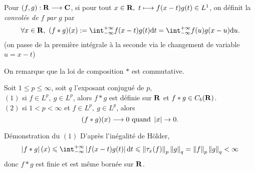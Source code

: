 \documentclass[a4paper,11pt, twoside]{article}
\begin{document}
\begin{Def}
  Pour $(f,g):\mathbf R\longrightarrow\mathbf C$, si pour tout $x\in \mathbf R,\ t\longmapsto f(x-t)g(t)\in L^1$, on définit la \emph{convolée de }$f$\emph{ par }$g$ par 
  $$\forall x\in\R,\ (f*g)(x):=\int_{-\infty}^{+\infty}f(x-t)g(t)\dt=\int_{-\infty}^{+\infty}f(u)g(x-u)\mathrm du.$$
  (on passe de la première intégrale à la seconde via le changement de variable $u=x-t$)
\end{Def}


\begin{RQ}
  On remarque que la loi de composition $*$ est commutative.
\end{RQ}


\begin{Th}
  Soit $1\leqslant p\leqslant \infty$, soit $q$ l'exposant conjugué de $p$,\\

  $(\mathit 1)$ si $f\in L^p,\ g\in L^p$, alors $f*g$ est définie sur $\mathbf R$ et $f*g\in C_b(\mathbf R)$.\\
  $(\mathit 2)$ si $1<p< \infty$ et $f\in L^p,\ g\in L^p$, alors 
  $$(f*g)(x)\longrightarrow 0\text{ quand }\left| x\right|\to 0.$$ 
\end{Th}


\begin{ProofC}{Démonstration du $(\mathit 1)$}
  D'après l'inégalité de Hölder, 
  $$\abs{f*g}(x)\leqslant\intr\abs{f(x-t)g(t)}\dt\leqslant\norm{\tau_x(f)}_p\norm{g}_q=\norm{f}_p\norm{g}_q<\infty$$
  donc $f*g$ est finie et est même bornée sur $\mathbf R$.
\end{ProofC}
\end{document}
